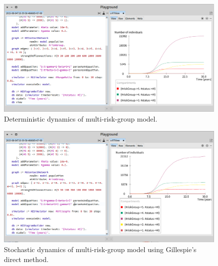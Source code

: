 \documentclass[a4paper,10pt,twoside]{book}
\begin{document}
\begin{figure}

\begin{center}
\includegraphics[width=1.0\textwidth]{figures/Multi_Risk_RK4.png}\caption{Deterministic dynamics of multi-risk-group model.\label{Multi_Risk_RK4}}\end{center}
\end{figure}



\begin{figure}

\begin{center}
\includegraphics[width=1.0\textwidth]{figures/Multi_Risk_Gil.png}\caption{Stochastic dynamics of multi-risk-group model using Gillespie's direct method.\label{Multi_Risk_Gil}}\end{center}
\end{figure}
\end{document}

